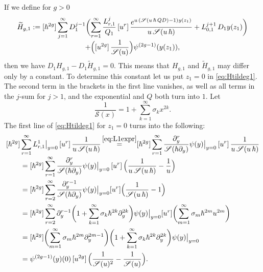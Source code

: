 \documentclass[JEP,XML,SOM,Unicode,NoEqCountersInSection,NoFloatCountersInSection]{cedram}
\let\mathcal\mathscr
\theoremstyle{plain}
\theoremstyle{definition}
\theoremstyle{remark}
\newcommand{\cS}{\mathcal{S}}
\begin{document}
If we define for $g>0$\vspace*{-5pt}
\begin{multline}\label{eq:Htildeg1}
\widetilde H_{g,1} :=[\hbar^{2g}]\sum_{j=1}^\infty D_1^{j-1} \biggl(\sum_{r=1}^\infty\frac{L_{r,1}^j}{Q_1}
\,[u^r]\, \frac{e^{u\,(\cS(u\,\hbar\,Q D)-1)y(z_1)}}{u\,\cS(u\,\hbar)}+L_{0,1}^{j+1}\, D_1y(z_1) \biggr)
\\[-3pt]
+\Bigl([u^{2g}]\,\frac1{\cS(u)}\Bigr) \psi^{(2g-1)}(y(z_1)),
\end{multline}
then we have $D_1H_{g,1}-D_1\widetilde H_{g,1}=0$. This means that $H_{g,1}$ and $\widetilde H_{g,1}$ may differ only by a constant. To determine this constant let us put $z_1=0$ in \eqref{eq:Htildeg1}. The second term in the brackets in the first line vanishes, as well as all terms in the $j$-sum for $j>1$, and the exponential and $Q$ both turn into $1$.
Let\vspace*{-5pt}
\begin{equation*}
\dfrac{1}{\cS(x)}=1+\sum_{k=1}^\infty \sigma_k x^{2k}.
\end{equation*}
The first line of \eqref{eq:Htildeg1} for $z_1=0$ turns into the following:\vspace*{-5pt}
\begin{align*}
&[\hbar^{2g}]\sum_{r=1}^\infty L_{r,1}^1\big|_{y=0}
\,[u^r]\, \frac{1}{u\,\cS(u\,\hbar)}\mathop{=}^{\eqref{eq:L1expr}}[\hbar^{2g}]\sum_{r=1}^\infty \frac{\partial_{y}^r}{\cS(\hbar \partial_{y})}\psi(y)\big|_{y=0} \,[u^r]\, \frac{1}{u\,\cS(u\,\hbar)} \\[-3pt]
&\qquad =[\hbar^{2g}]\sum_{r=1}^\infty \frac{\partial_{y}^r}{\cS(\hbar \partial_{y})}\psi(y)\big|_{y=0} \,[u^r]\, \Bigl(\frac{1}{u\,\cS(u\,\hbar)}-\dfrac{1}{u} \Bigr)\\
&\qquad =[\hbar^{2g}]\sum_{r=2}^\infty \frac{\partial_{y}^{r-1}}{\cS(\hbar \partial_{y})}\psi(y)\big|_{y=0} [u^{r}] \Bigl(\frac{1}{\cS(u\,\hbar)}-1 \Bigr)\\
&\qquad =[\hbar^{2g}]\sum_{r=2}^\infty \partial_{y}^{r-1}\biggl(1+\sum_{k=1}^\infty \sigma_k \hbar^{2k}\partial_y^{2k} \biggr)\psi(y)\big|_{y=0} [u^{r}] \biggl(\sum_{m=1}^\infty \sigma_m \hbar^{2m}u^{2m} \biggr)\\
&\qquad =[\hbar^{2g}] \biggl(\sum_{m=1}^\infty \sigma_m \hbar^{2m}\partial_y^{2m-1} \biggr) \biggl(1+\sum_{k=1}^\infty \sigma_k \hbar^{2k}\partial_y^{2k} \biggr)\psi(y)\big|_{y=0}\\
&\qquad =\psi^{(2g-1)}(y)(0)\,[u^{2g}]\,\Bigl(\dfrac{1}{\cS(u)^2}-\dfrac{1}{\cS(u)}\Bigr).
\end{align*}
\end{document}
